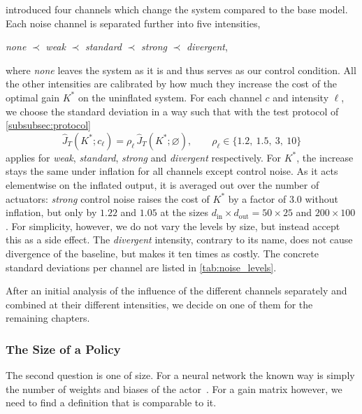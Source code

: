  introduced four channels which change the system
compared to the base model. Each noise channel is separated further
into five intensities,

\begin{center}
    \emph{none} $\prec$ \emph{weak} $\prec$ \emph{standard} $\prec$
    \emph{strong} $\prec$ \emph{divergent},
\end{center}

where \emph{none} leaves the system as it is and thus serves as our
control condition. All the other intensities are calibrated by how much
they increase the cost of the optimal gain $K^{*}$ on the uninflated system. 
For each channel $c$ and intensity $\ell$, we choose the standard deviation 
in a way such that with the test protocol of \cref{subsubsec:protocol}
\begin{equation}
    \label{eq:noise-calibration}
    \hat{J}_T(K^{*}; c_{\ell}) = \rho_{\ell}\, \hat{J}_T(K^{*}; \varnothing),
    \qquad
    \rho_{\ell} \in \{1.2,\ 1.5,\ 3,\ 10\}
\end{equation}
applies for \emph{weak}, \emph{standard}, \emph{strong} and \emph{divergent}
respectively.
For $K^{*}$, the increase stays the same under inflation for all channels
except control noise. As it acts elementwise on the inflated output, it
is averaged out over the number of actuators: \emph{strong} control noise raises the
cost of $K^{*}$ by a factor of $3.0$ without inflation, but only by $1.22$ and
$1.05$ at the sizes $d_{\mathrm{in}} \times d_{\mathrm{out}} = 50 \times 25$ and $200 \times 100$.
For simplicity, however, we do not vary the levels by size, but instead accept this
as a side effect.
The \emph{divergent} intensity, contrary to its name,
does not cause divergence of the baseline, but makes it ten times as costly. 
The concrete standard deviations per channel are listed in 
\cref{tab:noise_levels}.

After an initial analysis of the influence of the different channels
separately and combined at their different intensities, we decide on
one of them for the remaining chapters.

\subsubsection{The Size of a Policy}
\label{subsubsec:policy-size}

The second question is one of size. For a neural network the known way 
is simply the number of weights and biases of the actor~.
For a gain matrix however, we need to find a definition that is comparable to it.

